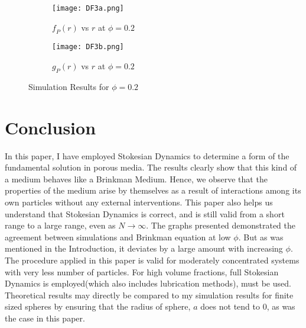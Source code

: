 \documentclass[12pt]{article}
\begin{document}
\begin{figure}[ht]
\begin{subfigure}{.5\textwidth}
  \centering
  \texttt{[image: DF3a.png]}  
  \caption{$\textit{f}_P(r)$ vs $r$ at $\phi=0.2$}
\end{subfigure}
\begin{subfigure}{.5\textwidth}
  \centering
  \texttt{[image: DF3b.png]}  
  \caption{$\textit{g}_P(r)$ vs $r$ at $\phi=0.2$}
\end{subfigure}
\caption{Simulation Results for $\phi=0.2$}
\end{figure}

\newpage
\section{Conclusion}

In this paper, I have employed Stokesian Dynamics to determine a form of the fundamental solution in porous media. The results clearly show that this kind of a medium behaves like a Brinkman Medium. Hence, we observe that the properties of the medium arise by themselves as a result of interactions among its own particles without any external interventions. This paper also helps us understand that Stokesian Dynamics is correct, and is still valid from a short range to a large range, even as $N\rightarrow\infty$. The graphs presented demonstrated the agreement between simulations and Brinkman equation at low $\phi$. But as was mentioned in the Introduction, it deviates by a large amount with increasing $\phi$. The procedure applied in this paper is valid for moderately concentrated systems with very less number of particles. For high volume fractions, full Stokesian Dynamics is employed(which also includes lubrication methods), must be used. Theoretical results may directly be compared to my simulation results for finite sized spheres by ensuring that the radius of sphere, $a$ does not tend to 0, as was the case in this paper.
\end{document}
